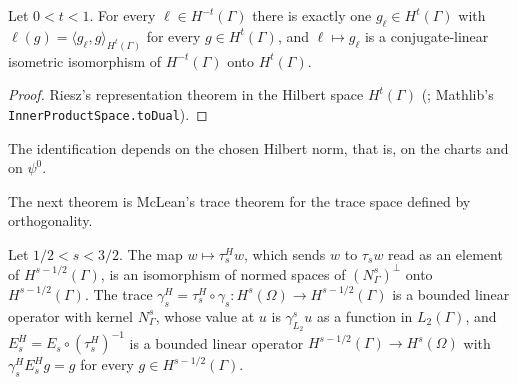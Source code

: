 \begin{theorem}
\label{thm:dual-boundary-sobolev}
\leanok
{}
Let $0 < t < 1$. For every $\ell \in H^{-t}(\Gamma)$ there is exactly one
$g_\ell \in H^t(\Gamma)$ with $\ell(g) = \langle g_\ell, g \rangle_{H^t(\Gamma)}$ for every
$g \in H^t(\Gamma)$, and $\ell \mapsto g_\ell$ is a conjugate-linear isometric isomorphism of
$H^{-t}(\Gamma)$ onto $H^t(\Gamma)$.
\end{theorem}

\begin{proof}
\leanok
Riesz's representation theorem in the Hilbert space $H^t(\Gamma)$ (;
Mathlib's \texttt{InnerProductSpace.\allowbreak toDual}).
\end{proof}

The identification depends on the chosen Hilbert norm, that is, on the charts and on $\psi^0$.

The next theorem is McLean's trace theorem \cite[Theorem 3.38]{McLean} for the trace space
defined by orthogonality.

\begin{theorem}
\label{thm:trace-space-boundary-sobolev}
\leanok
{}
Let $1/2 < s < 3/2$. The map $w \mapsto \tau^H_s w$, which sends $w$ to $\tau_s w$ read as an
element of $H^{s-1/2}(\Gamma)$, is an isomorphism of normed spaces of $(N^s_\Gamma)^\perp$ onto
$H^{s-1/2}(\Gamma)$. The trace
$\gamma^H_s = \tau^H_s \circ \gamma_s \colon H^s(\Omega) \to H^{s-1/2}(\Gamma)$ is a bounded
linear operator with kernel $N^s_\Gamma$, whose value at $u$ is $\gamma^s_{L_2} u$ as a function
in $L_2(\Gamma)$, and $E^H_s = E_s \circ (\tau^H_s)^{-1}$ is a bounded linear operator
$H^{s-1/2}(\Gamma) \to H^s(\Omega)$ with $\gamma^H_s E^H_s g = g$ for every
$g \in H^{s-1/2}(\Gamma)$.
\end{theorem}


